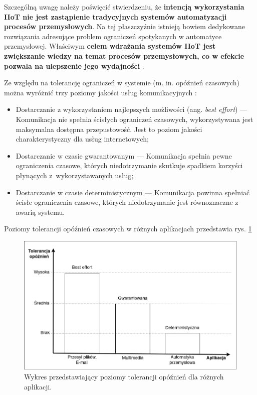 \documentclass[a4paper, 12pt, twoside]{article}
\begin{document}
Szczególną uwagę należy poświęcić stwierdzeniu, że \textbf{intencją wykorzystania IIoT nie
      jest zastąpienie tradycyjnych systemów automatyzacji procesów przemysłowych}.
Na tej płaszczyźnie istnieją bowiem dedykowane rozwiązania adresujące
problem ograniczeń spotykanych w automatyce przemysłowej.
Właściwym \textbf{celem wdrażania systemów IIoT jest zwiększanie wiedzy na temat procesów
      przemysłowych, co w efekcie pozwala na ulepszenie jego wydajności} \cite{iiot-challenges-opportunities-directions}.

Ze względu na tolerancję ograniczeń w systemie (m. in. opóźnień czasowych) można
wyróżnić trzy poziomy jakości usług komunikacyjnych \cite{iot-hype-to-reality}:
\begin{itemize}
      \itemsep0em
      \item Dostarczanie z wykorzystaniem najlepszych możliwości (ang. \emph{best effort})
            --- Komunikacja nie spełnia ścisłych ograniczeń czasowych, wykorzystywana jest
            maksymalna dostępna przepustowość. Jest to poziom jakości charakterystyczny
            dla usług internetowych;
      \item Dostarczanie w czasie gwarantowanym
            --- Komunikacja spełnia pewne ograniczenia czasowe, których niedotrzymanie
            skutkuje spadkiem korzyści płynących z~wykorzystawanych usług;
      \item Dostarczanie w czasie deterministycznym
            --- Komunikacja powinna spełniać ścisłe ograniczenia czasowe,
            których niedotrzymanie jest równoznaczne z awarią systemu.
\end{itemize}
Poziomy tolerancji opóźnień czasowych w różnych aplikacjach przedstawia rys. \ref{fig:tolerancja}

\begin{figure}
      \centering
      \includegraphics[scale=0.4]{tolerancja.png}
      \caption{Wykres przedstawiający poziomy tolerancji opóźnień dla różnych aplikacji.}
      \label{fig:tolerancja}
\end{figure}
\end{document}
